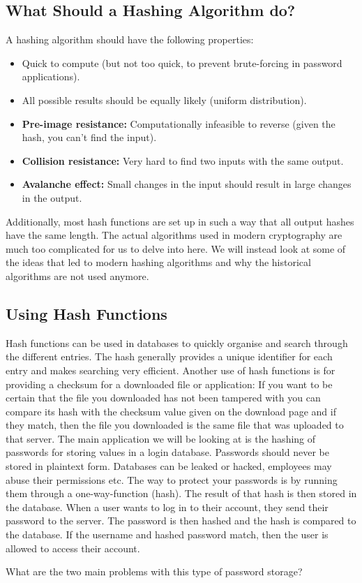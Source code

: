 \documentclass[11pt,a4paper]{report}
\begin{document}
\subsection{What Should a Hashing Algorithm do?}

A hashing algorithm should have the following properties:
\begin{itemize}
\item Quick to compute (but not too quick, to prevent brute-forcing in password applications).
\item All possible results should be equally likely (uniform distribution).
\item \textbf{Pre-image resistance:} Computationally infeasible to reverse (given the hash, you can't find the input).
\item \textbf{Collision resistance:} Very hard to find two inputs with the same output.
\item \textbf{Avalanche effect:} Small changes in the input should result in large changes in the output.
\end{itemize}

Additionally, most hash functions are set up in such a way that all output hashes have the same length.
The actual algorithms used in modern cryptography are much too complicated for us to delve into here.
We will instead look at some of the ideas that led to modern hashing algorithms and why the historical algorithms are not used anymore.

\subsection{Using Hash Functions}

Hash functions can be used in databases to quickly organise and search through the different entries.
The hash generally provides a unique identifier for each entry and makes searching very efficient.
Another use of hash functions is for providing a checksum for a downloaded file or application: If you want to be certain that the file you downloaded has not been tampered with you can compare its hash with the checksum value given on the download page and if they match, then the file you downloaded is the same file that was uploaded to that server.
The main application we will be looking at is the hashing of passwords for storing values in a login database.
Passwords should never be stored in plaintext form. Databases can be leaked or hacked, employees may abuse their permissions etc. The way to protect your passwords is by running them through a one-way-function (hash).
The result of that hash is then stored in the database.
When a user wants to log in to their account, they send their password to the server.
The password is then hashed and the hash is compared to the database.
If the username and hashed password match, then the user is allowed to access their account.
\begin{ex}
What are the two main problems with this type of password storage?
\end{ex}
\end{document}
